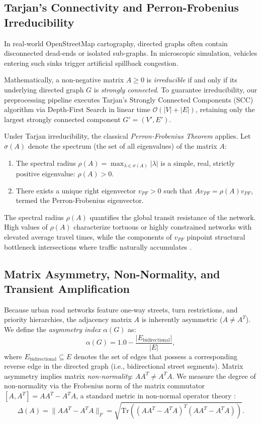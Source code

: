 \documentclass[lettersize,journal]{IEEEtran}
\begin{document}
\subsection{Tarjan's Connectivity and Perron-Frobenius Irreducibility}
In real-world OpenStreetMap cartography, directed graphs often contain disconnected dead-ends or isolated sub-graphs. In microscopic simulation, vehicles entering such sinks trigger artificial spillback congestion.

Mathematically, a non-negative matrix $A \ge 0$ is \emph{irreducible} if and only if its underlying directed graph $G$ is \emph{strongly connected}. To guarantee irreducibility, our preprocessing pipeline executes Tarjan's Strongly Connected Components (SCC) algorithm \cite{Tarjan1972} via Depth-First Search in linear time $\mathcal{O}(|V| + |E|)$, retaining only the largest strongly connected component $G' = (V', E')$.

Under Tarjan irreducibility, the classical \emph{Perron-Frobenius Theorem} \cite{Perron1907, Frobenius1912} applies. Let $\sigma(A)$ denote the spectrum (the set of all eigenvalues) of the matrix $A$:
\begin{enumerate}
    \item The spectral radius $\rho(A) = \max_{\lambda \in \sigma(A)} |\lambda|$ is a simple, real, strictly positive eigenvalue: $\rho(A) > 0$.
    \item There exists a unique right eigenvector $v_{PF} > 0$ such that $A v_{PF} = \rho(A) v_{PF}$, termed the Perron-Frobenius eigenvector.
\end{enumerate}
The spectral radius $\rho(A)$ quantifies the global transit resistance of the network. High values of $\rho(A)$ characterize tortuous or highly constrained networks with elevated average travel times, while the components of $v_{PF}$ pinpoint structural bottleneck intersections where traffic naturally accumulates \cite{Cvetkovic1980, Bell2000}.

\subsection{Matrix Asymmetry, Non-Normality, and Transient Amplification}
Because urban road networks feature one-way streets, turn restrictions, and priority hierarchies, the adjacency matrix $A$ is inherently asymmetric ($A \neq A^T$). We define the \emph{asymmetry index} $\alpha(G)$ as:
\begin{equation}
\alpha(G) = 1.0 - \frac{|E_{\text{bidirectional}}|}{|E|},
\end{equation}
where $E_{\text{bidirectional}} \subseteq E$ denotes the set of edges that possess a corresponding reverse edge in the directed graph (i.e., bidirectional street segments). Matrix asymmetry implies matrix \emph{non-normality}: $A A^T \neq A^T A$. We measure the degree of non-normality via the Frobenius norm of the matrix commutator $[A, A^T] = A A^T - A^T A$, a standard metric in non-normal operator theory \cite{Schur1909, Henrici1962}:
\begin{equation}
\Delta(A) = \| A A^T - A^T A \|_F = \sqrt{\text{Tr}\left( (A A^T - A^T A)^T (A A^T - A^T A) \right)}.
\end{equation}
\end{document}
